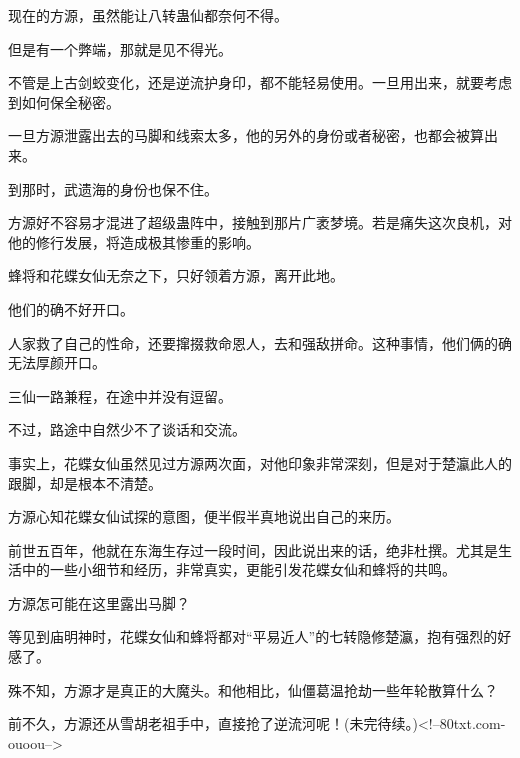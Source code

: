 \begin{this_body}
现在的方源，虽然能让八转蛊仙都奈何不得。

但是有一个弊端，那就是见不得光。

不管是上古剑蛟变化，还是逆流护身印，都不能轻易使用。一旦用出来，就要考虑到如何保全秘密。

一旦方源泄露出去的马脚和线索太多，他的另外的身份或者秘密，也都会被算出来。

到那时，武遗海的身份也保不住。

方源好不容易才混进了超级蛊阵中，接触到那片广袤梦境。若是痛失这次良机，对他的修行发展，将造成极其惨重的影响。

蜂将和花蝶女仙无奈之下，只好领着方源，离开此地。

他们的确不好开口。

人家救了自己的性命，还要撺掇救命恩人，去和强敌拼命。这种事情，他们俩的确无法厚颜开口。

三仙一路兼程，在途中并没有逗留。

不过，路途中自然少不了谈话和交流。

事实上，花蝶女仙虽然见过方源两次面，对他印象非常深刻，但是对于楚瀛此人的跟脚，却是根本不清楚。

方源心知花蝶女仙试探的意图，便半假半真地说出自己的来历。

前世五百年，他就在东海生存过一段时间，因此说出来的话，绝非杜撰。尤其是生活中的一些小细节和经历，非常真实，更能引发花蝶女仙和蜂将的共鸣。

方源怎可能在这里露出马脚？

等见到庙明神时，花蝶女仙和蜂将都对“平易近人”的七转隐修楚瀛，抱有强烈的好感了。

殊不知，方源才是真正的大魔头。和他相比，仙僵葛温抢劫一些年轮散算什么？

前不久，方源还从雪胡老祖手中，直接抢了逆流河呢！(未完待续。)<!--80txt.com-ouoou-->

\end{this_body}

